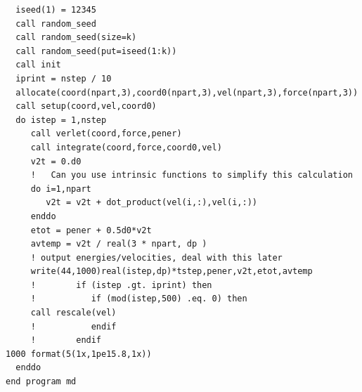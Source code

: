 \documentclass[slidestop,mathserif,compress,xcolor=svgnames]{beamer}
\newenvironment{eblock}[0]
{
\begin{beamerboxesrounded}[upper=uppercol2,lower=lowercol2,shadow=true]}
{\end{beamerboxesrounded}}
\begin{document}
\begin{frame}
{\begin{columns}
\begin{eblock}{}
\begin{verbatim}
  iseed(1) = 12345
  call random_seed
  call random_seed(size=k)
  call random_seed(put=iseed(1:k))
  call init
  iprint = nstep / 10
  allocate(coord(npart,3),coord0(npart,3),vel(npart,3),force(npart,3))
  call setup(coord,vel,coord0)   
  do istep = 1,nstep
     call verlet(coord,force,pener)
     call integrate(coord,force,coord0,vel)
     v2t = 0.d0
     !   Can you use intrinsic functions to simplify this calculation
     do i=1,npart
        v2t = v2t + dot_product(vel(i,:),vel(i,:))
     enddo
     etot = pener + 0.5d0*v2t
     avtemp = v2t / real(3 * npart, dp )
     ! output energies/velocities, deal with this later
     write(44,1000)real(istep,dp)*tstep,pener,v2t,etot,avtemp
     !        if (istep .gt. iprint) then
     !           if (mod(istep,500) .eq. 0) then
     call rescale(vel)
     !           endif   
     !        endif
1000 format(5(1x,1pe15.8,1x))
  enddo
end program md
        \end{verbatim}
      \end{eblock}
    \end{columns}
  }
\end{frame}
\end{document}
